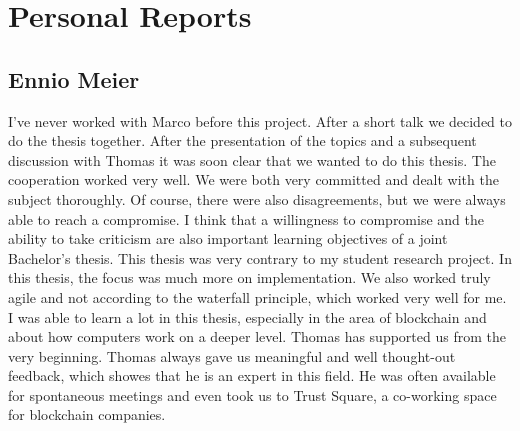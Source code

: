 \chapter{Personal Reports}
\section{Ennio Meier}
I've never worked with Marco before this project. After a short talk we decided to do the thesis together. After the presentation of the topics and a subsequent discussion with Thomas it was soon clear that we wanted to do this thesis. The cooperation worked very well. We were both very committed and dealt with the subject thoroughly. Of course, there were also disagreements, but we were always able to reach a compromise. I think that a willingness to compromise and the ability to take criticism are also important learning objectives of a joint Bachelor's thesis. This thesis was very contrary to my student research project. In this thesis, the focus was much more on implementation. We also worked truly agile and not according to the waterfall principle, which worked very well for me. I was able to learn a lot in this thesis, especially in the area of blockchain and about how computers work on a deeper level. Thomas has supported us from the very beginning. Thomas always gave us meaningful and well thought-out feedback, which showes that he is an expert in this field. He was often available for spontaneous meetings and even took us to Trust Square, a co-working space for blockchain companies. 

